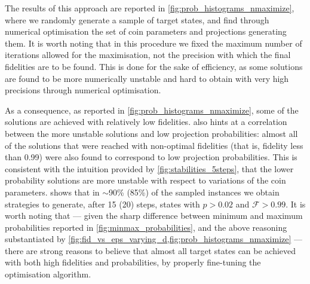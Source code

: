 The results of this approach are reported in \cref{fig:prob_histograms_nmaximize}, where we randomly generate a sample of target states, and find through numerical optimisation the set of coin parameters and projections generating them.
It is worth noting that in this procedure we fixed the maximum number of iterations allowed for the maximisation, not the precision with which the final fidelities are to be found.
This is done for the sake of efficiency, as some solutions are found to be more numerically unstable and hard to obtain with very high precisions through numerical optimisation.

As a consequence, as reported in \cref{fig:prob_histograms_nmaximize}, some of the solutions are achieved with relatively low fidelities.
 also hints at a correlation between the more unstable solutions and low projection probabilities:
almost all of the solutions that were reached with non-optimal fidelities (that is, fidelity less than 0.99) were also found to correspond to low projection probabilities.
This is consistent with the intuition provided by \cref{fig:stabilities_5steps},
that the lower probability solutions are more unstable with respect to variations of the coin parameters.
 shows that in $\sim$90\% (85\%) of the sampled instances we obtain strategies to generate, after 15 (20) steps, states with $p > 0.02$ and $\mathcal F > 0.99$.
It is worth noting that --- given the sharp difference between minimum and maximum probabilities reported in \cref{fig:minmax_probabilities}, and the above reasoning substantiated by \cref{fig:fid_vs_eps_varying_d,fig:prob_histograms_nmaximize} ---
there are strong reasons to believe that almost all target states can be achieved with both high fidelities and probabilities,
by properly fine-tuning the optimisation algorithm.

